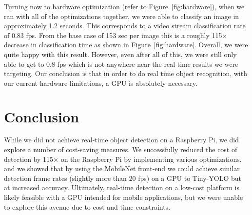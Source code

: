 \documentclass{article}
\begin{document}
Turning now to hardware optimization (refer to Figure~\ref{fig:hardware}), when we ran with all of the optimizations together, we were able to classify an image in approximately 1.2 seconds. This corresponds to a video stream classification rate of 0.83 fps. From the base case of 153 sec per image this is a roughly 115$\times$ decrease in classification time as shown in Figure~\ref{fig:hardware}. Overall, we were quite happy with this result. However, even after all of this, we were still only able to get to 0.8 fps which is not anywhere near the real time results we were targeting. Our conclusion is that in order to do real time object recognition, with our current hardware limitations, a GPU is absolutely necessary.

\section{Conclusion}
\label{conclusion}

While we did not achieve real-time object detection on a Raspberry Pi, we did explore a number of cost-saving measures. We successfully reduced the cost of detection by 115$\times$ on the Raspberry Pi by implementing various optimizations, and we showed that by using the MobileNet front-end we could achieve similar detection frame rates (slightly more than 20 fps) on a GPU to Tiny-YOLO but at increased accuracy. Ultimately, real-time detection on a low-cost platform is likely feasible with a GPU intended for mobile applications, but we were unable to explore this avenue due to cost and time constraints.
\end{document}
